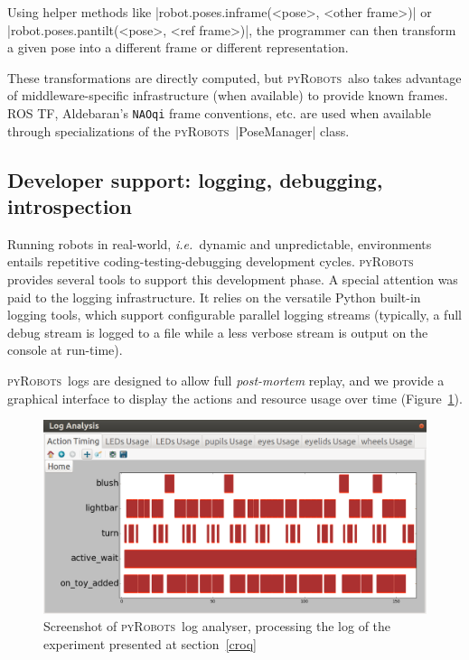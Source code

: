 \documentclass[a4paper, 10pt, conference]{ieeeconf}      %
\newcommand{\ie}{{\textit{i.e.\ }}}
\newcommand{\pyRobots}{\textsc{pyRobots}\ }
\begin{document}
Using helper methods like \python|robot.poses.inframe(<pose>, <other frame>)| or
\python|robot.poses.pantilt(<pose>, <ref frame>)|, the programmer can then
transform a given pose into a different frame or different representation.

These transformations are directly computed, but \pyRobots also takes advantage
of middleware-specific infrastructure (when available) to provide known frames.
ROS TF, Aldebaran's {\tt NAOqi} frame conventions, etc. are used when available
through specializations of the \pyRobots \python|PoseManager| class.

\subsection{Developer support: logging, debugging, introspection}
\label{}

Running robots in real-world, \ie dynamic and unpredictable, environments
entails repetitive coding-testing-debugging development cycles. \pyRobots
provides several tools to support this development phase. A special attention
was paid to the logging infrastructure. It relies on the versatile Python
built-in logging tools, which support configurable parallel logging streams
(typically, a full debug stream is logged to a file while a less verbose stream
is output on the console at run-time).

\pyRobots logs are designed to allow full \emph{post-mortem} replay, and we
provide a graphical interface to display the actions and resource usage over
time (Figure~\ref{log_view}).

\begin{figure}
        \centering
        \includegraphics[width=0.9\columnwidth]{log}
        \caption{Screenshot of \pyRobots log analyser, processing the log of the
        experiment presented at section~\ref{croq}}
        \label{log_view}
\end{figure}
\end{document}
